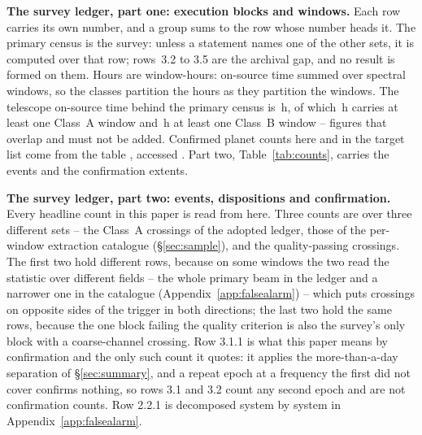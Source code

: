 \begin{table}
\centering
\scriptsize
\caption{\textbf{The survey ledger, part one: execution blocks and windows.}
Each row carries its own number, and a group sums to the row whose number
heads it. The
primary census is the survey: unless a statement names one of the other sets,
it is computed over that row; rows~3.2 to 3.5 are the archival gap, and no
result is formed on them. Hours are window-hours: on-source time summed
over spectral windows, so the classes partition the hours as they partition
the windows. The telescope on-source time behind the primary census is
\StTelHours\,h, of which \StTelHoursFine\,h carries at least one Class~A
window and \StTelHoursCoarse\,h at least one Class~B window -- figures that
overlap and must not be added. Confirmed planet counts here and in the
target list come from the \SfHostCatalogue{} \SfHostTable{} table
\citep{NEA2013}, accessed \SfHostDate. Part two, Table~\ref{tab:counts},
carries the events and the confirmation extents.}
\label{tab:blockledger}

\end{table}

\begin{table}
\centering
\scriptsize
\caption{\textbf{The survey ledger, part two: events, dispositions and
confirmation.} Every headline count in this paper is read from here. Three
counts are \MtCrossA{} over three different sets -- the Class~A crossings of
the adopted ledger, those of the per-window extraction catalogue
(\S\ref{sec:sample}), and the
quality-passing crossings. The first two hold different rows, because on some
windows the two read the statistic over different fields -- the whole primary
beam in the ledger and a narrower one in the catalogue
(Appendix~\ref{app:falsealarm}) -- which puts crossings on opposite sides of
the trigger in both directions; the last two hold the same rows,
because the one block failing the quality criterion is also the survey's only
block with a coarse-channel crossing. Row 3.1.1 is what this
paper means by confirmation and the only such count it quotes: it applies the
more-than-a-day separation of \S\ref{sec:summary}, and a repeat epoch
at a frequency the first did not cover confirms nothing, so rows 3.1 and 3.2
count any second epoch and are not confirmation counts. Row 2.2.1 is
decomposed system by system in Appendix~\ref{app:falsealarm}.}
\label{tab:counts}

\end{table}


